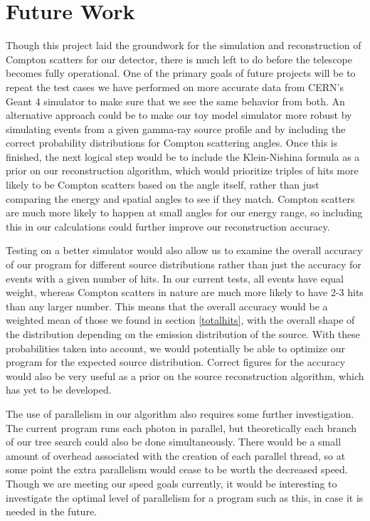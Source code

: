 \section{Future Work}
Though this project laid the groundwork for the simulation and reconstruction of Compton scatters for our detector, there is much left to do before the telescope becomes fully operational. One of the primary goals of future projects will be to repeat the test cases we have performed on more accurate data from CERN's Geant 4 simulator to make sure that we see the same behavior from both. An alternative approach could be to make our toy model simulator more robust by simulating events from a given gamma-ray source profile and by including the correct probability distributions for Compton scattering angles. Once this is finished, the next logical step would be to include the Klein-Nishina formula as a prior on our reconstruction algorithm, which would prioritize triples of hits more likely to be Compton scatters based on the angle itself, rather than just comparing the energy and spatial angles to see if they match. Compton scatters are much more likely to happen at small angles for our energy range, so including this in our calculations could further improve our reconstruction accuracy.

Testing on a better simulator would also allow us to examine the overall accuracy of our program for different source distributions rather than just the accuracy for events with a given number of hits. In our current tests, all events have equal weight, whereas Compton scatters in nature are much more likely to have 2-3 hits than any larger number. This means that the overall accuracy would be a weighted mean of those we found in section \ref{totalhits}, with the overall shape of the distribution depending on the emission distribution of the source. With these probabilities taken into account, we would potentially be able to optimize our program for the expected source distribution. Correct figures for the accuracy would also be very useful as a prior on the source reconstruction algorithm, which has yet to be developed.

The use of parallelism in our algorithm also requires some further investigation. The current program runs each photon in parallel, but theoretically each branch of our tree search could also be done simultaneously. There would be a small amount of overhead associated with the creation of each parallel thread, so at some point the extra parallelism would cease to be worth the decreased speed. Though we are meeting our speed goals currently, it would be interesting to investigate the optimal level of parallelism for a program such as this, in case it is needed in the future. 

